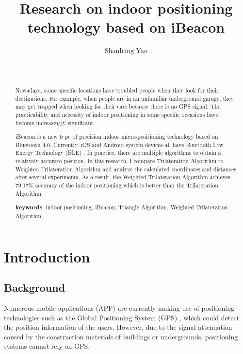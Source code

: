 \documentclass{sigchi}
\begin{document}
\title{Research on indoor positioning technology based on iBeacon}

\author{
  \alignauthor Shanliang Yao\\
    \\
    \\
}

\maketitle

\begin{abstract}
Nowadays, some specific locations have troubled people when they look for their destinations. For example, when people are in an unfamiliar underground garage, they may get trapped when looking for their cars because there is no GPS signal. The practicability and necessity of indoor positioning in some specific occasions have become increasingly significant.

iBeacon is a new type of precision indoor micro-positioning technology based on Bluetooth 4.0. Currently, iOS and Android system devices all have Bluetooth Low Energy Technology (BLE) \cite{gomez2012overview}. In practice, there are multiple algorithms to obtain a relatively accurate position. In this research, I compare Trilateration Algorithm to Weighted Trilateration Algorithm and analyze the calculated coordinates and distances after several experiments. As a result, the Weighted Trilateration Algorithm achieves 79.17\% accuracy of the indoor positioning which is better than the Trilateration Algorithm. 

\textbf{keywords}: indoor positioning, iBeacon, Triangle Algorithm, Weighted Trilateration Algorithm
\end{abstract}

\section{Introduction}

\subsection{Background}

Numerous mobile applications (APP) are currently making use of positioning technologies such as the Global Positioning System (GPS) \cite{misra2006global}, which could detect the position information of the users. However, due to the signal attenuation caused by the construction materials of buildings or undergrounds, positioning systems cannot rely on GPS.
\end{document}
